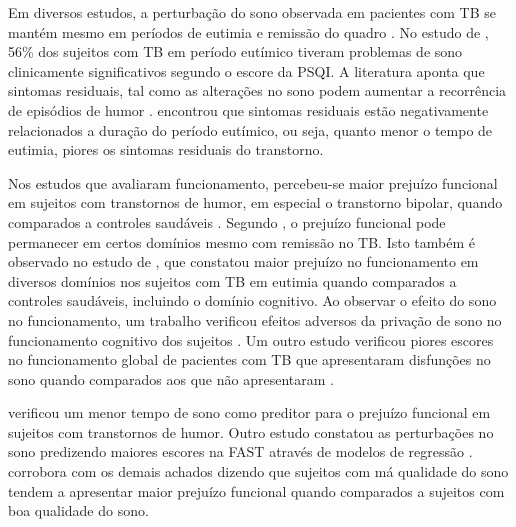 \documentclass[chapter=TITLE,
               oneside,
               12pt,
               a4paper,
               english,
               brazil]{abntex2}    %
\begin{document}
        Em diversos estudos, a perturbação do sono observada em pacientes com
        TB se mantém mesmo em períodos de eutimia e remissão
        do quadro
        \parencite{geoffroy_comment_2017,
        karthick_quality_2015,
        de_la_fuente-tomas_sleep_2018}.
        No estudo de \textcite{keskin_assessment_2018}, 56\% dos sujeitos com TB
        em período eutímico tiveram problemas de sono clinicamente significativos
        segundo o escore da PSQI.
        A literatura aponta que sintomas residuais, tal como as alterações no
        sono podem aumentar a recorrência de episódios de humor
        \parencite{sylvia_sleep_2012,
        kaplan_hypersomnia_2015}.
        \textcite{samalin_course_2016} encontrou que sintomas residuais estão
        negativamente relacionados a duração do período eutímico, ou seja,
        quanto menor o tempo de eutimia, piores os sintomas residuais do
        transtorno.

        Nos estudos que avaliaram funcionamento, percebeu-se maior prejuízo 
        funcional em sujeitos com transtornos de humor, em especial o
        transtorno bipolar, quando comparados a controles saudáveis
        \parencite{reyes_functional_2017,
        kapczinski_cognition_2016,
        rosa_functional_2010,
        rosa_clinical_2009}.
        Segundo \textcite{boland_sleep_2013}, o prejuízo funcional pode
        permanecer em certos domínios mesmo com remissão no TB.
        Isto também é observado no estudo de \textcite{rosa_clinical_2009},
        que constatou maior prejuízo no funcionamento em diversos domínios
        nos sujeitos com TB em eutimia quando comparados a controles saudáveis,
        incluindo o domínio cognitivo.
        Ao observar o efeito do sono no funcionamento, um trabalho verificou
        efeitos adversos da privação de sono no funcionamento cognitivo
        dos sujeitos
        \parencite{harvey_sleep_2009}.
        Um outro estudo verificou piores escores no funcionamento global
        de pacientes com TB que apresentaram disfunções no sono
        quando comparados aos que não apresentaram 
        \parencite{giglio_sleep_2009}.

        \textcite{slyepchenko_association_2019} verificou um menor tempo de
        sono como preditor para o prejuízo funcional em sujeitos com transtornos
        de humor. Outro estudo constatou as perturbações no sono predizendo
        maiores escores na FAST através de modelos de regressão
        \parencite{walz_daytime_2013}.
        \textcite{lai_familiality_2014} corrobora com os demais achados dizendo
        que sujeitos com má qualidade do sono tendem a apresentar maior
        prejuízo funcional quando comparados a sujeitos com boa qualidade do sono.
\end{document}
